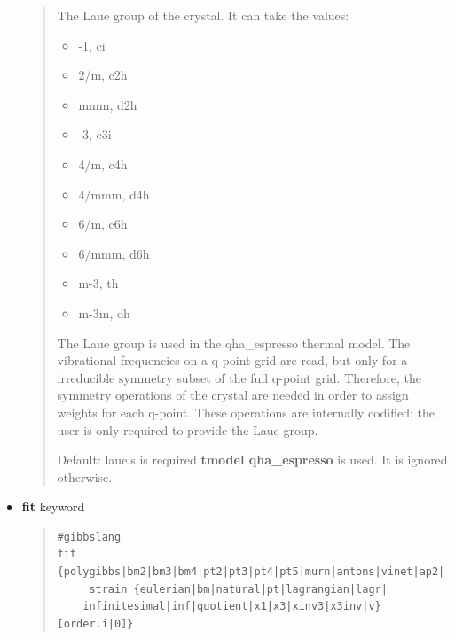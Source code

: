 \documentclass[a4paper]{article}
\begin{document}
\begin{itemize}
\begin{quote}
The Laue group of the crystal. It can take the values:

\begin{itemize}
\item -1, ci

\item 2/m, c2h

\item mmm, d2h

\item -3, c3i

\item 4/m, c4h

\item 4/mmm, d4h

\item 6/m, c6h

\item 6/mmm, d6h

\item m-3, th

\item m-3m, oh
\end{itemize}

The Laue group is used in the qha\_espresso thermal model. The
vibrational frequencies on a q-point grid are read, but only for a
irreducible symmetry subset of the full q-point grid. Therefore, the
symmetry operations of the crystal are needed in order to assign
weights for each q-point. These operations are internally codified:
the user is only required to provide the Laue group.

Default: laue.s is required \textbf{tmodel qha\_espresso} is used. It is
ignored otherwise.
\end{quote}

\item \textbf{fit} keyword

\begin{quote}
\begin{verbatim}
#gibbslang
fit {polygibbs|bm2|bm3|bm4|pt2|pt3|pt4|pt5|murn|antons|vinet|ap2|
     strain {eulerian|bm|natural|pt|lagrangian|lagr|
    infinitesimal|inf|quotient|x1|x3|xinv3|x3inv|v} [order.i|0]}
\end{verbatim}
\end{quote}


\end{itemize}
\end{document}
